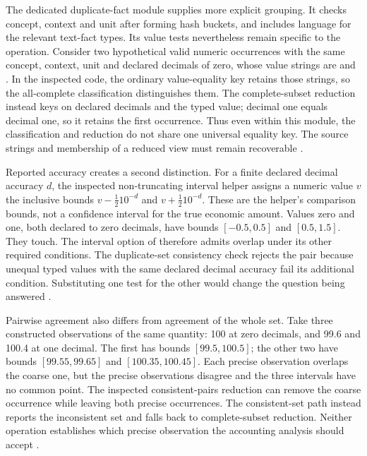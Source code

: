 The dedicated duplicate-fact module supplies more explicit grouping. It checks
concept, context and unit after forming hash buckets, and includes language
for the relevant text-fact types. Its value tests nevertheless remain specific
to the operation. Consider two hypothetical valid numeric occurrences with the
same concept, context, unit and declared decimals of zero, whose value strings
are  and . In the inspected code, the ordinary value-equality
key retains those strings, so the all-complete classification distinguishes
them. The complete-subset reduction instead keys on declared decimals and the
typed value; decimal one equals decimal one, so it retains the first occurrence.
Thus even within this module, the classification and reduction do not share
one universal equality key. The source strings and membership of a reduced
view must remain recoverable \citep{arellefactidentity2026}.

Reported accuracy creates a second distinction. For a finite declared decimal
accuracy $d$, the inspected non-truncating interval helper assigns a numeric
value $v$ the inclusive bounds $v-\tfrac12 10^{-d}$ and
$v+\tfrac12 10^{-d}$. These are the helper's comparison bounds, not a confidence
interval for the true economic amount. Values zero and one, both declared to
zero decimals, have bounds $[-0.5,0.5]$ and $[0.5,1.5]$. They touch. The
interval option of  therefore admits overlap under its other
required conditions. The duplicate-set consistency check rejects the pair
because unequal typed values with the same declared decimal accuracy fail its
additional condition. Substituting one test for the other would change the
question being answered \citep{arellefactidentity2026}.

Pairwise agreement also differs from agreement of the whole set. Take three
constructed observations of the same quantity: 100 at zero decimals, and 99.6
and 100.4 at one decimal. The first has bounds $[99.5,100.5]$; the other two
have bounds $[99.55,99.65]$ and $[100.35,100.45]$. Each precise observation
overlaps the coarse one, but the precise observations disagree and the three
intervals have no common point. The inspected consistent-pairs reduction can
remove the coarse occurrence while leaving both precise occurrences. The
consistent-set path instead reports the inconsistent set and falls back to
complete-subset reduction. Neither operation establishes which precise
observation the accounting analysis should accept \citep{arellefactidentity2026}.


